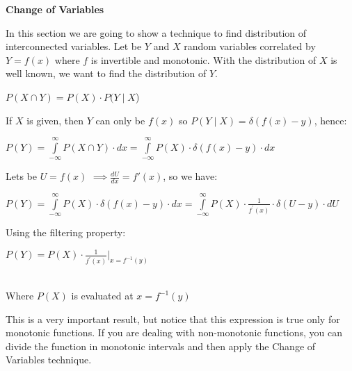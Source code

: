\documentclass[paper=9in:6in,pagesize=pdftex,headinclude=on,footinclude=on,10pt,bibtotoc,pointlessnumbers,normalheadings,DIV=9,twoside=false]{scrbook}
\begin{document}
\date{}

\begin{center}
\begin{large}
 \textbf{Change of Variables \\}
\end{large}
\end{center}

\begin{text} 
 In this section we are going to show a technique to find distribution of interconnected variables. Let be $Y$ and $X$ random variables correlated by $Y=f(x)$ where $f$ is invertible and monotonic. With the distribution of $X$ is well known, we want to find the distribution of $Y$.
\end{text}

\begin{center}
    $P(X \cap Y ) = P(X) \cdot P(Y \mid X$) \\
\end{center}

\begin{text}
If $X$ is given, then $Y$ can only be $f(x)$ so $ P(Y \mid X) = \delta (f(x) - y )$, hence:
\end{text}

\begin{center}
    $P(Y) = \int\limits_{-\infty}^{\infty} P(X \cap Y ) \cdot dx =\int\limits_{-\infty}^{\infty} P(X) \cdot \delta (f(x) - y  ) \cdot dx $ \\
\end{center}

\begin{text}
Lets be $U= f(x)$ $\implies \frac{dU}{dx} = f{'}(x) $, so we have: \\
\end{text}

\begin{center}
    $P(Y) = \int\limits_{-\infty}^{\infty} P(X) \cdot \delta ( f(x)-y  ) \cdot dx = \int\limits_{-\infty}^{\infty} P(X) \cdot \frac{1}{f^{'}(x)} \cdot \delta ( U-y  ) \cdot dU $ \\
\end{center}

\begin{text}
Using the filtering property:\\
\end{text}
\begin{center}
    $P(Y) = P(X)  \cdot \frac{1}{f^{'}(x)} \big|_{x=f^{-1}(y)} $\\
\end{center}

\begin{text}
\ \\

Where $P(X)$ is evaluated at $x=f^{-1}(y)$ \\
\end{text}

\begin{text}
This is a very important result, but notice that this expression is true only for monotonic functions. If you are dealing with non-monotonic functions, you can divide the function in monotonic intervals and then apply the Change of Variables technique.
\end{text}
\end{document}
